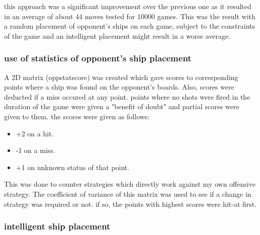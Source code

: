 \documentclass{article}
\begin{document}
	this approach was a significant improvement over the previous one as it resulted in an average of about $44$ moves tested for $10000$ games. This was the result with a random placement of opponent's ships on each game, subject to the constraints of the game and an intelligent placement might result in a worse average.
	
	\subsubsection{use of statistics of opponent's ship placement}
	
	A 2D matrix (oppstatscore) was created which gave scores to corresponding points where a ship was found on the opponent's boards. Also, scores were deducted if a miss occured at any point. points where no shots were fired in the duration of the game were given a "benefit of doubt" and partial scores were given to them. the scores were given as follows: 
	\begin{itemize}
		\item +2 on a hit.
		\item -1 on a miss.
		\item +1 on unknown status of that point.
	\end{itemize}		
This was done to counter strategies which directly work against my own offensive strategy. The coefficient of variance of this matrix was used to see if a change in strategy was required or not. if so, the points with highest scores were hit-at first.
	
	
	\subsubsection{intelligent ship placement}
	
\end{document}
